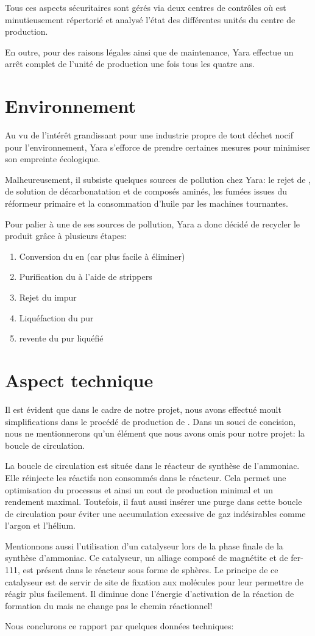 \documentclass[a4paper,12pt, oneside]{article}
\begin{document}
		Tous ces aspects sécuritaires sont gérés via deux centres de contrôles où est minutieusement répertorié et analysé l'état des différentes unités du centre de production.
		
		En outre, pour des raisons légales ainsi que de maintenance, Yara effectue un arrêt complet de l'unité de production une fois tous les quatre ans.
		
\section{Environnement}
	Au vu de l'intérêt grandissant pour une industrie propre de tout déchet nocif pour l'environnement, Yara  s'efforce de prendre certaines mesures pour minimiser son empreinte écologique. 
	
	Malheureusement, il subsiste quelques sources de pollution chez Yara: le rejet de , de solution de décarbonatation et de composés aminés, les fumées issues du réformeur primaire et la consommation d'huile par les machines tournantes.
	
	Pour palier à une de ses sources de pollution, Yara a donc décidé de recycler le  produit grâce à plusieurs étapes:
		\begin{enumerate}
		\item Conversion du  en  (car plus facile à éliminer)
		\item Purification du  à l'aide de strippers
		\item Rejet du  impur
		\item Liquéfaction du  pur
		\item revente du  pur liquéfié
		\end{enumerate}
		
\section{Aspect technique}
	Il est évident que dans le cadre de notre projet, nous avons effectué moult simplifications dans le procédé de production de . Dans un souci de concision, nous ne mentionnerons qu'un élément que nous avons omis pour notre projet: la boucle de circulation.
	
	La boucle de circulation est située dans le réacteur de synthèse de l'ammoniac. Elle réinjecte les réactifs non consommés dans le réacteur. Cela permet une optimisation du processus et ainsi un cout de production minimal et un rendement maximal. Toutefois, il faut aussi insérer une purge dans cette boucle de circulation pour éviter une accumulation excessive de gaz indésirables comme l'argon et l'hélium.
		
	Mentionnons aussi l'utilisation d'un catalyseur lors de la phase finale de la synthèse d'ammoniac. Ce catalyseur, un alliage composé de magnétite et de fer-111, est présent dans le réacteur sous forme de sphères. Le principe de ce catalyseur est de servir de site de fixation aux molécules pour leur permettre de réagir plus facilement. Il diminue donc l'énergie d'activation de la réaction de formation du  mais ne change pas le chemin réactionnel!
	
	Nous conclurons ce rapport par quelques données techniques:
		
		
\end{document}
